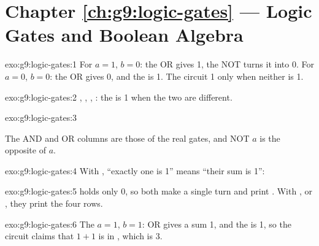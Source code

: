 \section*{Chapter \ref{ch:g9:logic-gates} --- Logic Gates and Boolean Algebra}

\begin{solution}{exo:g9:logic-gates:1}
For $a = 1$, $b = 0$: the OR gives 1, the NOT turns it into 0. For $a = 0$,
$b = 0$: the OR gives 0, and the  is 1. The circuit  1 only when
neither  is 1.
\end{solution}

\begin{solution}{exo:g9:logic-gates:2}
, , , : the  is
1 when the two  are different.
\end{solution}

\begin{solution}{exo:g9:logic-gates:3}
\label{out:g9:logic-gates:nand}

The AND and OR columns are those of the real gates, and NOT $a$ is the opposite
of $a$.
\end{solution}

\begin{solution}{exo:g9:logic-gates:4}
With , ``exactly one is 1'' means ``their sum is 1'':

\label{lst:g9:logic-gates:sol-one}
\end{solution}

\begin{solution}{exo:g9:logic-gates:5}
 holds only 0, so both  make a single turn and print
. With , or \code{[0, 1]}, they print the four
rows.
\end{solution}

\begin{solution}{exo:g9:logic-gates:6}
The  $a = 1$, $b = 1$: OR gives a sum  1, and the  is 1, so the
circuit claims that $1 + 1$ is  in , which is 3.
\end{solution}

